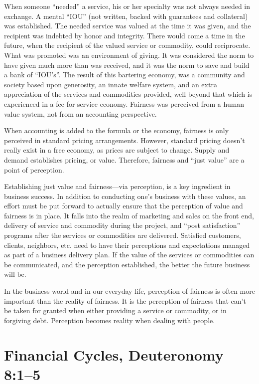 \documentclass[12pt]{memoir}
\begin{document}
When someone ``needed'' a service, his or her specialty was not
always needed in exchange. A mental ``IOU'' (not written, backed
with guarantees and collateral) was established. The needed service
was valued at the time it was given, and the recipient was indebted
by honor and integrity. There would come a time in the future, when
the recipient of the valued service or commodity, could reciprocate.
What was promoted was an environment of giving. It was considered
the norm to have given much more than was received, and it was the
norm to save and build a bank of ``IOU's''. The result of this bartering
economy, was a community and society based upon generosity, an innate
welfare system, and an extra appreciation of the services and commodities
provided, well beyond that which is experienced in a fee for service
economy. Fairness was perceived from a human value system, not from
an accounting perspective.

When accounting is added to the formula or the economy, fairness is
only perceived in standard pricing arrangements. However, standard
pricing doesn't really exist in a free economy, as prices are subject
to change. Supply and demand establishes pricing, or value. Therefore,
fairness and ``just value'' are a point of perception. 

Establishing just value and fairness---via perception, is a key ingredient
in business success. In addition to conducting one's business with
these values, an effort must be put forward to actually ensure that
the perception of value and fairness is in place. It falls into the
realm of marketing and sales on the front end, delivery of service
and commodity during the project, and ``post satisfaction'' programs
after the services or commodities are delivered. Satisfied customers,
clients, neighbors, etc. need to have their perceptions and expectations
managed as part of a business delivery plan. If the value of the services
or commodities can be communicated, and the perception established,
the better the future business will be. 

In the business world and in our everyday life, perception of fairness
is often more important than the reality of fairness. It is the perception
of fairness that can't be taken for granted when either providing
a service or commodity, or in forgiving debt. Perception becomes reality
when dealing with people. 

\section{Financial Cycles, Deuteronomy 8:1--5}
\end{document}
